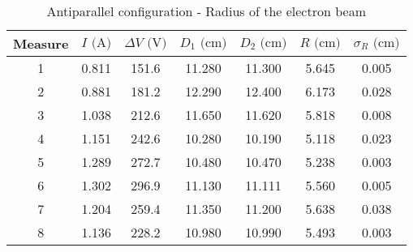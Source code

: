 \begin{table}[H]
    {\par\centering
    \begin{tabular}{ccccccc}
        \hline
        Measure & $I \text{ (A)}$ & $\Delta V \text{ (V)}$ & $D_1 \text{ (cm)}$ & $D_2 \text{ (cm)}$ & $R \text{ (cm)}$ & $\sigma_R \text{ (cm)}$ \\
        \hline
        1   &   0.811&   151.6&  11.280&  11.300& 5.645&  0.005\\
        2   &   0.881&   181.2&  12.290&  12.400& 6.173&  0.028\\
        3   &   1.038&   212.6&  11.650&  11.620& 5.818&  0.008\\
        4   &   1.151&   242.6&  10.280&  10.190& 5.118&  0.023\\
        5   &   1.289&   272.7&  10.480&  10.470& 5.238&  0.003\\
        6   &   1.302&   296.9&  11.130&  11.111& 5.560&  0.005\\
        7   &   1.204&   259.4&  11.350&  11.200& 5.638&  0.038\\
        8   &   1.136&   228.2&  10.980&  10.990& 5.493&  0.003\\
        \hline
    \end{tabular}
    \par}
    \caption{Antiparallel configuration - Radius of the electron beam}
\end{table}

